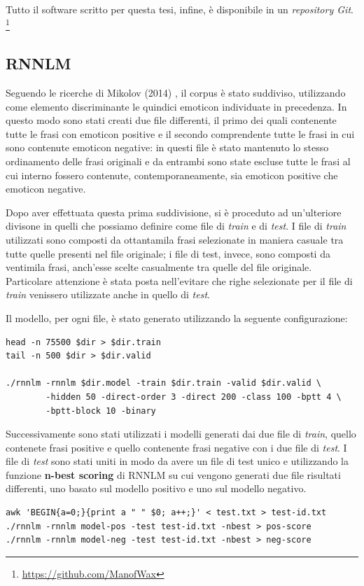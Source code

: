 \documentclass[a4paper,12pt,openright,twoside]{report}
\theoremstyle{definition}
\begin{document}
Tutto il software scritto per questa tesi, infine, è disponibile in un \emph{repository Git}.
\footnote{\url{https://github.com/ManofWax}}

\subsection{RNNLM}
\label{sss:rnnlm}
Seguendo le ricerche di Mikolov (2014) %
, il corpus è stato suddiviso, utilizzando come elemento discriminante le 
quindici emoticon individuate in precedenza.
In questo modo
sono stati creati due file differenti,
il primo dei quali contenente tutte le frasi con emoticon positive e il secondo comprendente
tutte le frasi in cui sono contenute emoticon negative: in questi file è stato mantenuto lo stesso ordinamento delle frasi originali
e da entrambi sono state escluse tutte le frasi al cui interno fossero contenute, 
contemporaneamente, sia emoticon positive che emoticon negative. 

Dopo aver effettuata questa prima suddivisione, si è proceduto ad un'ulteriore
divisone in quelli che possiamo definire come file di \emph{train} e di \emph{test}.
I file di \emph{train} utilizzati sono composti da ottantamila frasi selezionate in maniera casuale tra tutte quelle presenti nel file originale;
i file di test, invece, sono composti da ventimila frasi,
anch'esse scelte casualmente tra quelle del file originale.
Particolare attenzione è stata posta nell'evitare che righe selezionate per il file di \emph{train}
venissero utilizzate anche in quello di \emph{test}.

Il modello, per ogni file, è stato generato utilizzando la seguente configurazione:

\begin{verbatim}
head -n 75500 $dir > $dir.train
tail -n 500 $dir > $dir.valid

./rnnlm -rnnlm $dir.model -train $dir.train -valid $dir.valid \
        -hidden 50 -direct-order 3 -direct 200 -class 100 -bptt 4 \
        -bptt-block 10 -binary
\end{verbatim}

Successivamente sono stati utilizzati i modelli generati dai due file di \emph{train}, 
quello contenete
frasi positive e quello contenente frasi negative con i due file di \emph{test}. 
I file di \emph{test}
sono stati uniti in modo da avere un file di test unico e utilizzando la funzione 
\textbf{n-best scoring} di RNNLM
su cui vengono generati due file risultati differenti, uno basato sul
modello positivo e uno sul modello negativo.
\begin{verbatim}
awk 'BEGIN{a=0;}{print a " " $0; a++;}' < test.txt > test-id.txt
./rnnlm -rnnlm model-pos -test test-id.txt -nbest > pos-score
./rnnlm -rnnlm model-neg -test test-id.txt -nbest > neg-score
\end{verbatim}
\end{document}
